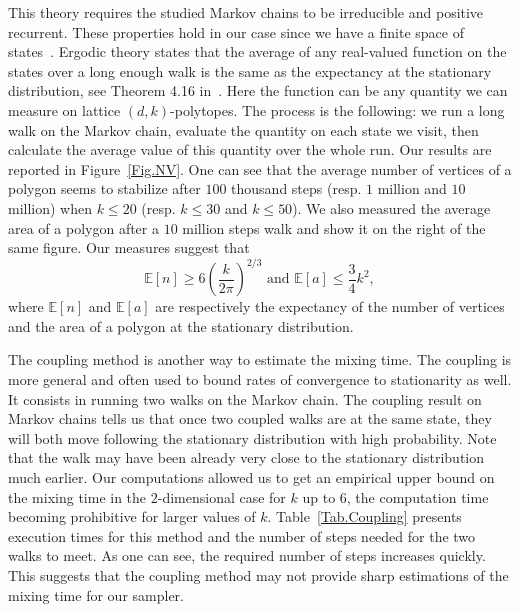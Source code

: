 \documentclass[a4paper,10pt]{article}
\begin{document}
This theory requires the studied Markov chains to be irreducible and positive recurrent. These properties hold in our case since we have a finite space of states~\cite{levin2009markov}. Ergodic theory states that the average of any real-valued function on the states over a long enough walk is the same as the expectancy at the stationary distribution, see Theorem 4.16 in~\cite{levin2009markov}. Here the function can be any quantity we can measure on lattice $(d,k)$-polytopes. The process is the following: we run a long walk on the Markov chain, evaluate the quantity on each state we visit, then calculate the average value of this quantity over the whole run.
Our results are reported in Figure~\ref{Fig.NV}. One can see that the average number of vertices of a polygon seems to stabilize after $100$ thousand steps (resp. $1$ million and $10$ million) when $k\leq 20$ (resp. $k\leq 30$ and $k\leq 50$).
We also measured the average area of a polygon after a $10$ million steps walk and show it on the right of the same figure. Our measures suggest that
$$
\mathbb{E}[n] \ge 6\left(\frac{k}{2\pi}\right)^{2/3} \text{ and } \mathbb{E}[a] \leq \frac{3}{4} k^2,
$$
where $\mathbb{E}[n]$ and $\mathbb{E}[a]$ are respectively the expectancy of the number of vertices and the area of a polygon at the stationary distribution.

The coupling method is another way to estimate the mixing time. The coupling is more general and often used to bound rates of convergence to stationarity as well. It consists in running two walks on the Markov chain.
The coupling result on Markov chains tells us that once two coupled walks are at the same state, they will both move following the stationary distribution with high probability. Note that the walk may have been already very close to the stationary distribution much earlier.
Our computations allowed us to get an empirical upper bound on the  mixing time in the $2$-dimensional case for $k$ up to $6$, the computation time becoming prohibitive for larger values of $k$.
Table~\ref{Tab.Coupling} presents execution times for this method and the number of steps needed for the two walks to meet.
As one can see, the required number of steps increases quickly. This suggests that the coupling method may not provide sharp estimations of the mixing time for our sampler.
\end{document}
